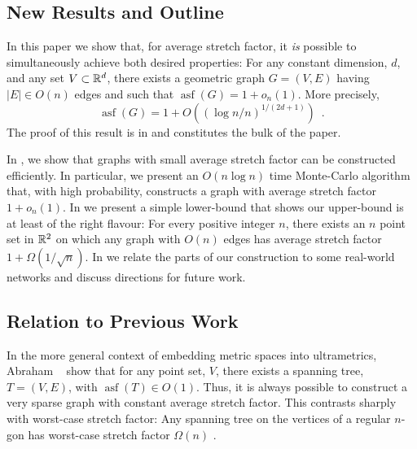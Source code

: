 \documentclass{patmorin}
\DeclareMathOperator{\asf}{asf}
\begin{document}
\subsection{New Results and Outline}

In this paper we show that, for average stretch factor, it \emph{is}
possible to simultaneously achieve both desired properties: For any
constant dimension, $d$, and any set $V\subset \mathbb{R}^d$, there exists
a geometric graph $G=(V,E)$ having $|E|\in O(n)$ edges and such that
$\asf(G)=1+o_n(1)$.  More precisely,
\[
   \asf(G)=1+O((\log n/n)^{1/(2d+1)}) \enspace .
\]
The proof of this result is in  and constitutes the
bulk of the paper.  

In , we show that graphs with small average stretch
factor can be constructed efficiently.  In particular, we present an
$O(n\log n)$ time Monte-Carlo algorithm that, with high probability,
constructs a graph with average stretch factor $1+o_n(1)$.  
In  we present a simple lower-bound that shows our
upper-bound is at least of the right flavour:  For every positive integer
$n$, there exists an $n$ point set in $\mathbb{R}^2$ on which any graph with
$O(n)$ edges has average stretch factor $1+\Omega(1/\sqrt{n})$.
In  we relate the parts of our construction to some
real-world networks and discuss directions for future work.

\subsection{Relation to Previous Work}


In the more general context of embedding metric spaces into ultrametrics,
Abraham \etal\ \cite{abraham.bartal.ea:metric,abraham.bartal.ea:embedding}
show that for any point set, $V$, there exists a spanning tree,
$T=(V,E)$, with $\asf(T)\in O(1)$.  Thus, it is always possible to
construct a very sparse graph with constant average stretch factor.
This contrasts sharply with worst-case stretch factor: Any spanning
tree on the vertices of a regular $n$-gon has worst-case stretch factor
$\Omega(n)$ \cite[Lemma~15]{eppstein:spanning-report}.
\end{document}
